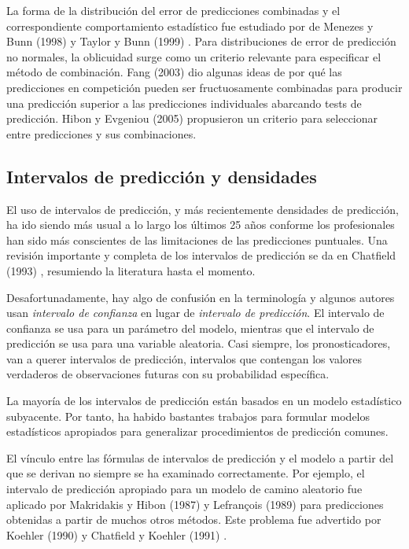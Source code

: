 \documentclass{llncs}
\begin{document}
La forma de la distribución del error de predicciones combinadas y el correspondiente comportamiento estadístico fue estudiado por de Menezes y Bunn (1998) \cite{DeMenezes1998415} y Taylor y Bunn (1999) \cite{Taylor1999325}. Para distribuciones de error de predicción  no normales, la oblicuidad surge como un criterio relevante para especificar el método de combinación. Fang (2003) \cite{Fang200387} dio algunas ideas de por qué las predicciones en competición pueden ser fructuosamente combinadas para producir una predicción superior a las predicciones individuales abarcando tests de predicción. Hibon y Evgeniou (2005) \cite{Hibon200515} propusieron un criterio para seleccionar entre predicciones y sus combinaciones.

\subsection{Intervalos de predicción y densidades}
El uso de intervalos de predicción, y más recientemente densidades de predicción, ha ido siendo más usual a lo largo los últimos 25 años conforme los profesionales han sido más conscientes de las limitaciones de las predicciones puntuales. Una revisión importante y completa de los intervalos de predicción se da en Chatfield (1993) \cite{Chatfield1993121}, resumiendo la literatura hasta el momento.

Desafortunadamente, hay algo de confusión en la terminología y algunos autores usan \emph{intervalo de confianza} en lugar de \emph{ intervalo de predicción}. El intervalo de confianza se usa para un parámetro del modelo, mientras que el intervalo de predicción se usa para una variable aleatoria. Casi siempre, los pronosticadores, van a querer intervalos de predicción, intervalos que contengan los valores verdaderos de observaciones futuras con su probabilidad específica.

La mayoría de los intervalos de predicción están basados en un modelo estadístico subyacente. Por tanto, ha habido bastantes trabajos para formular modelos estadísticos apropiados para generalizar procedimientos de predicción comunes.

El vínculo entre las fórmulas de intervalos de predicción y el modelo a partir del que se derivan no siempre se ha examinado correctamente. Por ejemplo, el intervalo de predicción apropiado para un modelo de camino aleatorio fue aplicado por Makridakis y Hibon (1987) \cite{Makridakis1987489} y Lefrançois (1989) \cite{Lefrancois1989553} para predicciones obtenidas a partir de muchos otros métodos. Este problema fue advertido por Koehler (1990) \cite{Koehler1990557} y Chatfield y Koehler (1991) \cite{Chatfield1991239}.
\end{document}
